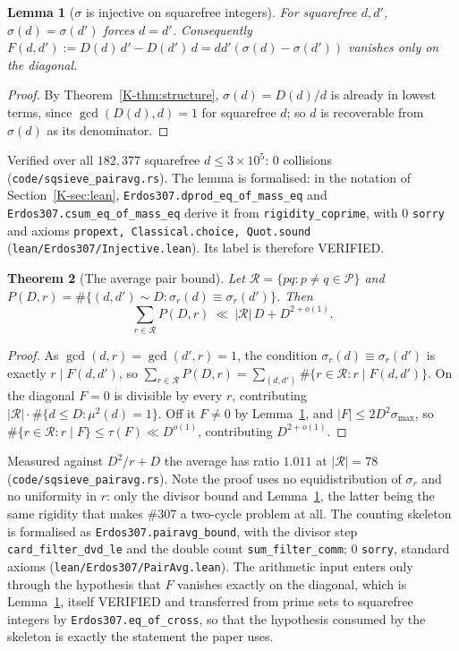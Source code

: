 \documentclass[11pt]{article}
\newtheorem{theorem}{Theorem}[section]
\newtheorem{lemma}[theorem]{Lemma}
\theoremstyle{definition}
\begin{document}
\begin{lemma}[$\sigma$ is injective on squarefree integers]\label{lem:sigmainj}
For squarefree $d,d'$, $\sigma(d)=\sigma(d')$ forces $d=d'$. Consequently
$F(d,d'):=D(d)\,d'-D(d')\,d=dd'(\sigma(d)-\sigma(d'))$ vanishes only on the diagonal.
\end{lemma}
\begin{proof}
By Theorem~\ref{K-thm:structure}, $\sigma(d)=D(d)/d$ is already in lowest terms, since
$\gcd(D(d),d)=1$ for squarefree $d$; so $d$ is recoverable from $\sigma(d)$ as its denominator.
\end{proof}
Verified over all $182{,}377$ squarefree $d\le3\times10^5$: $0$ collisions
\textup{(\texttt{code/sqsieve\_pairavg.rs})}. The lemma is formalised: in the notation of
Section~\ref{K-sec:lean}, \texttt{Erdos307.dprod\_eq\_of\_mass\_eq} and
\texttt{Erdos307.csum\_eq\_of\_mass\_eq} derive it from \texttt{rigidity\_coprime}, with $0$
\texttt{sorry} and axioms \texttt{propext, Classical.choice, Quot.sound}
\textup{(\texttt{lean/Erdos307/Injective.lean})}. Its label is therefore \textup{VERIFIED}.

\begin{theorem}[The average pair bound]\label{thm:pairavg}
Let $\mathcal{R}=\{pq:p\neq q\in\mathcal{P}\}$ and
$P(D,r)=\#\{(d,d')\sim D:\sigma_r(d)\equiv\sigma_r(d')\}$. Then
\[ \sum_{r\in\mathcal{R}}P(D,r)\ \ll\ |\mathcal{R}|\,D+D^{2+o(1)} . \]
\end{theorem}
\begin{proof}
As $\gcd(d,r)=\gcd(d',r)=1$, the condition $\sigma_r(d)\equiv\sigma_r(d')$ is exactly $r\mid F(d,d')$,
so $\sum_{r\in\mathcal{R}}P(D,r)=\sum_{(d,d')}\#\{r\in\mathcal{R}:r\mid F(d,d')\}$. On the diagonal
$F=0$ is divisible by every $r$, contributing $|\mathcal{R}|\cdot\#\{d\le D:\mu^2(d)=1\}$. Off it
$F\neq0$ by Lemma~\ref{lem:sigmainj}, and $|F|\le2D^2\sigma_{\max}$, so
$\#\{r\in\mathcal{R}:r\mid F\}\le\tau(F)\ll D^{o(1)}$, contributing $D^{2+o(1)}$.
\end{proof}
Measured against $D^2/r+D$ the average has ratio $1.011$ at $|\mathcal{R}|=78$
\textup{(\texttt{code/sqsieve\_pairavg.rs})}. Note the proof uses no equidistribution of $\sigma_r$
and no uniformity in $r$: only the divisor bound and Lemma~\ref{lem:sigmainj}, the latter being the
same rigidity that makes \#307 a two-cycle problem at all. The counting skeleton is formalised as
\texttt{Erdos307.pairavg\_bound}, with the divisor step \texttt{card\_filter\_dvd\_le} and the
double count \texttt{sum\_filter\_comm}; $0$ \texttt{sorry}, standard axioms
\textup{(\texttt{lean/Erdos307/PairAvg.lean})}. The arithmetic input enters only through the
hypothesis that $F$ vanishes exactly on the diagonal, which is Lemma~\ref{lem:sigmainj}, itself
\textup{VERIFIED} and transferred from prime sets to squarefree integers by
\texttt{Erdos307.eq\_of\_cross}, so that the hypothesis consumed by the skeleton is exactly the
statement the paper uses.
\end{document}
